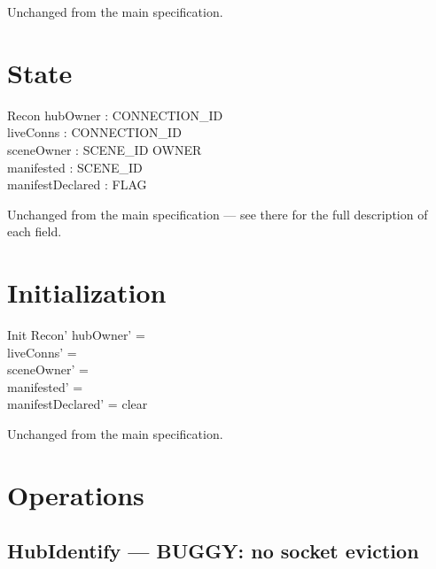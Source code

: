 \documentclass[a4paper,10pt,fleqn]{article}
\begin{document}
Unchanged from the main specification.

\section{State}

\begin{schema}{Recon}
  hubOwner : \power CONNECTION\_ID \\
  liveConns : \power CONNECTION\_ID \\
  sceneOwner : SCENE\_ID \pfun OWNER \\
  manifested : \power SCENE\_ID \\
  manifestDeclared : FLAG
\end{schema}

Unchanged from the main specification --- see there for the full
description of each field.

\section{Initialization}

\begin{schema}{Init}
  Recon'
\where
  hubOwner' = \emptyset \\
  liveConns' = \emptyset \\
  sceneOwner' = \emptyset \\
  manifested' = \emptyset \\
  manifestDeclared' = clear
\end{schema}

Unchanged from the main specification.

\section{Operations}

\subsection{HubIdentify --- BUGGY: no socket eviction}
\label{sec:identify}
\end{document}
